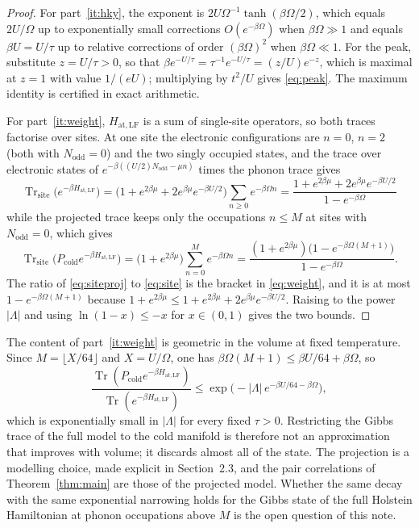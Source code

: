 \documentclass[11pt]{article}
\theoremstyle{plain}
\theoremstyle{definition}
\DeclareMathOperator{\Tr}{Tr}
\newcommand{\Nodd}{N_{\mathrm{odd}}}
\begin{document}
\begin{proof}
For part~\ref{it:hky}, the exponent is $2U\Omega^{-1}\tanh(\beta\Omega/2)$, which
equals $2U/\Omega$ up to exponentially small corrections $O(e^{-\beta\Omega})$
when $\beta\Omega\gg1$ and equals $\beta U=U/\tau$ up to relative corrections of
order $(\beta\Omega)^{2}$ when $\beta\Omega\ll1$. For the peak,
substitute $z=U/\tau>0$, so that $\beta e^{-U/\tau}=\tau^{-1}e^{-U/\tau}=(z/U)e^{-z}$,
which is maximal at $z=1$ with value $1/(eU)$; multiplying by $t^{2}/U$ gives
\eqref{eq:peak}. The maximum identity is certified in exact arithmetic.

For part~\ref{it:weight}, $H_{\mathrm{at,LF}}$ is a sum of single-site operators,
so both traces factorise over sites. At one site the electronic configurations are
$n=0$, $n=2$ (both with $\Nodd=0$) and the two singly occupied states, and the
trace over electronic states of
$e^{-\beta((U/2)\Nodd-\mu n)}$ times the phonon trace gives
\begin{equation}\label{eq:site}
\Tr_{\mathrm{site}}\bigl(e^{-\beta H_{\mathrm{at,LF}}}\bigr)
=\bigl(1+e^{2\beta\mu}+2e^{\beta\mu}e^{-\beta U/2}\bigr)\sum_{n\ge0}e^{-\beta\Omega n}
=\frac{1+e^{2\beta\mu}+2e^{\beta\mu}e^{-\beta U/2}}{1-e^{-\beta\Omega}}
\end{equation}
while the projected trace keeps only the occupations $n\le M$ at sites with
$\Nodd=0$, which gives
\begin{equation}\label{eq:siteproj}
\Tr_{\mathrm{site}}\bigl(P_{\mathrm{cold}}e^{-\beta H_{\mathrm{at,LF}}}\bigr)
=\bigl(1+e^{2\beta\mu}\bigr)\sum_{n=0}^{M}e^{-\beta\Omega n}
=\frac{(1+e^{2\beta\mu})\bigl(1-e^{-\beta\Omega(M+1)}\bigr)}{1-e^{-\beta\Omega}} .
\end{equation}
The ratio of \eqref{eq:siteproj} to \eqref{eq:site} is the bracket in
\eqref{eq:weight}, and it is at most $1-e^{-\beta\Omega(M+1)}$ because
$1+e^{2\beta\mu}\le1+e^{2\beta\mu}+2e^{\beta\mu}e^{-\beta U/2}$. Raising to the
power $|\Lambda|$ and using $\ln(1-x)\le-x$ for $x\in(0,1)$ gives the two bounds.
\end{proof}

The content of part~\ref{it:weight} is geometric in the volume at fixed
temperature. Since $M=\lfloor X/64\rfloor$ and $X=U/\Omega$, one has
$\beta\Omega(M+1)\le\beta U/64+\beta\Omega$, so
\begin{equation}\label{eq:weightbound}
\frac{\Tr(P_{\mathrm{cold}}e^{-\beta H_{\mathrm{at,LF}}})}{\Tr(e^{-\beta H_{\mathrm{at,LF}}})}
\le\exp\bigl(-|\Lambda|\,e^{-\beta U/64-\beta\Omega}\bigr),
\end{equation}
which is exponentially small in $|\Lambda|$ for every fixed $\tau>0$. Restricting
the Gibbs trace of the full model to the cold manifold is therefore not an
approximation that improves with volume; it discards almost all of the state. The
projection is a modelling choice, made explicit in Section~2.3, and the pair
correlations of Theorem~\ref{thm:main} are those of the projected model. Whether
the same decay with the same exponential narrowing holds for the Gibbs state of
the full Holstein Hamiltonian at phonon occupations above $M$ is the open
question of this note.
\end{document}
